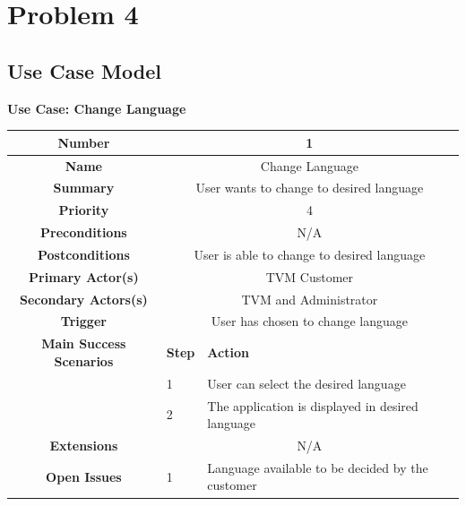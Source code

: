 \documentclass[a4paper,12pt]{report}
\begin{document}
\newpage
\section{Problem 4}
\subsection{Use Case Model}

\vspace{0.5cm}
\textbf{\large Use Case: Change Language} 
\\ 

\begin{tabular}{ | c | p{2cm} | p{7cm} |}
	
	\hline
	\textbf{Number} & \multicolumn{2}{c|}{1}  \\
	\hline
	\textbf{Name} & \multicolumn{2}{c|}{Change Language}  \\
	\hline
	\textbf{Summary} & \multicolumn{2}{c|}{User wants to change to desired language }  \\
	\hline
	\textbf{Priority} & \multicolumn{2}{c|}{4}  \\
	\hline
	\textbf{Preconditions} & \multicolumn{2}{c|}{N/A}  \\
	\hline
	\textbf{Postconditions} & \multicolumn{2}{c|}{User is able to change to desired language}  \\
	\hline
	\textbf{Primary Actor(s)} & \multicolumn{2}{c|}{TVM Customer}  \\
	\hline
	\textbf{Secondary Actors(s)} & \multicolumn{2}{c|}{TVM and Administrator}  \\
	\hline
	\textbf{Trigger} & \multicolumn{2}{c|}{User has chosen to change language}  \\
	\hline
	\textbf{Main Success Scenarios} & \textbf{Step} & \textbf{Action} \\
	\hline
	  & 1 & User can select the desired language \\ 
	\hline
	  &  2  & The application is displayed in desired language \\
	\hline
	\textbf{Extensions} & \multicolumn{2}{c|}{N/A}  \\
	\hline
	\textbf{Open Issues} &  1  & Language available to be decided by the customer \\
	\hline
	
\end{tabular}
\end{document}
